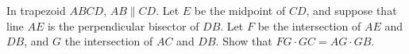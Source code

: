 In trapezoid $ABCD$, $AB\parallel CD$. Let $E$ be the midpoint of $CD$, and suppose that line $AE$ is the perpendicular bisector of $DB$. Let $F$ be the intersection of $AE$ and $DB$, and $G$ the intersection of $AC$ and $DB$. Show that $FG\cdot GC=AG\cdot GB$.
